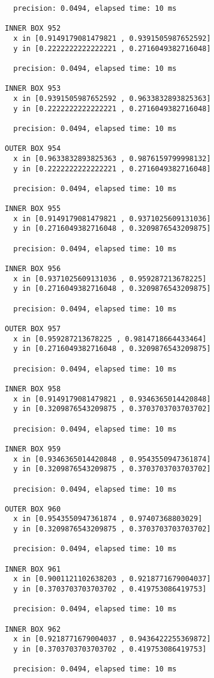 \begin{verbatim}
  precision: 0.0494, elapsed time: 10 ms

INNER BOX 952
  x in [0.9149179081479821 , 0.9391505987652592]
  y in [0.2222222222222221 , 0.2716049382716048]

  precision: 0.0494, elapsed time: 10 ms

INNER BOX 953
  x in [0.9391505987652592 , 0.9633832893825363]
  y in [0.2222222222222221 , 0.2716049382716048]

  precision: 0.0494, elapsed time: 10 ms

OUTER BOX 954
  x in [0.9633832893825363 , 0.9876159799998132]
  y in [0.2222222222222221 , 0.2716049382716048]

  precision: 0.0494, elapsed time: 10 ms

INNER BOX 955
  x in [0.9149179081479821 , 0.9371025609131036]
  y in [0.2716049382716048 , 0.3209876543209875]

  precision: 0.0494, elapsed time: 10 ms

INNER BOX 956
  x in [0.9371025609131036 , 0.959287213678225]
  y in [0.2716049382716048 , 0.3209876543209875]

  precision: 0.0494, elapsed time: 10 ms

OUTER BOX 957
  x in [0.959287213678225 , 0.9814718664433464]
  y in [0.2716049382716048 , 0.3209876543209875]

  precision: 0.0494, elapsed time: 10 ms

INNER BOX 958
  x in [0.9149179081479821 , 0.9346365014420848]
  y in [0.3209876543209875 , 0.3703703703703702]

  precision: 0.0494, elapsed time: 10 ms

INNER BOX 959
  x in [0.9346365014420848 , 0.9543550947361874]
  y in [0.3209876543209875 , 0.3703703703703702]

  precision: 0.0494, elapsed time: 10 ms

OUTER BOX 960
  x in [0.9543550947361874 , 0.97407368803029]
  y in [0.3209876543209875 , 0.3703703703703702]

  precision: 0.0494, elapsed time: 10 ms

INNER BOX 961
  x in [0.9001121102638203 , 0.9218771679004037]
  y in [0.3703703703703702 , 0.419753086419753]

  precision: 0.0494, elapsed time: 10 ms

INNER BOX 962
  x in [0.9218771679004037 , 0.9436422255369872]
  y in [0.3703703703703702 , 0.419753086419753]

  precision: 0.0494, elapsed time: 10 ms


\end{verbatim}
